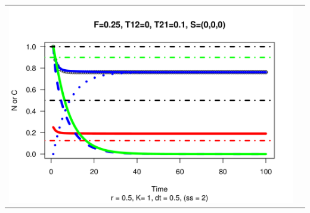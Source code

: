 \documentclass[a4paper,KOMA,landscape,titlepage]{powersem}
\begin{document}
\begin{slide}
\begin{center}
\begin{tabular}{cc}
\includegraphics[height=0.35\textheight]{./graphics/r05F025T120T2101S000.png}\\
\end{tabular}
\end{center}
\end{slide}
\end{document}

